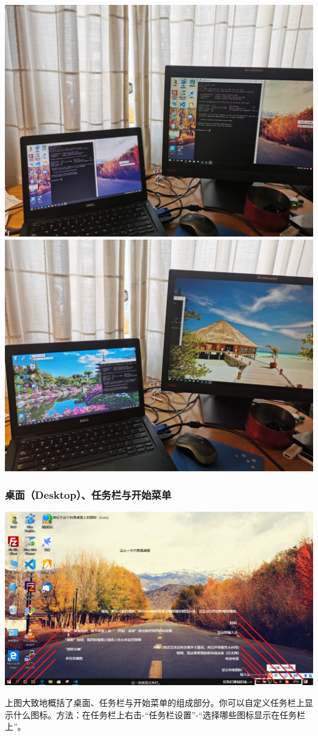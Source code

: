 \begin{center}
	\includegraphics[scale=0.08]{pic/ScrCopy}\\
	\includegraphics[scale=0.08]{pic/ScrExtend}
\end{center} 
\subsubsection{桌面（Desktop）、任务栏与开始菜单}
\begin{center}
	\includegraphics[scale=0.4,angle=90]{pic/screenIntro}
\end{center} \par
上图大致地概括了桌面、任务栏与开始菜单的组成部分。你可以自定义任务栏上显示什么图标。方法：在任务栏上右击-“任务栏设置”-“选择哪些图标显示在任务栏上”。
